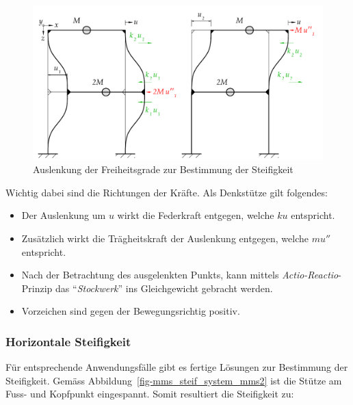 \documentclass[
  letterpaper,
  DIV=11]{scrreprt}
\providecommand{\tightlist}{%
  \setlength{\itemsep}{0pt}\setlength{\parskip}{0pt}}\usepackage{longtable,booktabs,array}
\begin{document}
\begin{figure}[H]

{\centering \includegraphics{index_files/mediabag/bilder/aufgabe_mms_steif_auslenk.pdf}

}

\caption{\label{fig-mms_steif_steifigkeit}Auslenkung der Freiheitsgrade
zur Bestimmung der Steifigkeit}

\end{figure}

Wichtig dabei sind die Richtungen der Kräfte. Als Denkstütze gilt
folgendes:

\begin{itemize}
\tightlist
\item
  Der Auslenkung um \(u\) wirkt die Federkraft entgegen, welche \(k u\)
  entspricht.
\item
  Zusätzlich wirkt die Trägheitskraft der Auslenkung entgegen, welche
  \(m u''\) entspricht.
\item
  Nach der Betrachtung des ausgelenkten Punkts, kann mittels
  \emph{Actio-Reactio}-Prinzip das ``\emph{Stockwerk}'' ins
  Gleichgewicht gebracht werden.
\item
  Vorzeichen sind gegen der Bewegungsrichtig positiv.
\end{itemize}

\hypertarget{horizontale-steifigkeit-2}{%
\subsubsection{Horizontale
Steifigkeit}\label{horizontale-steifigkeit-2}}

Für entsprechende Anwendungsfälle gibt es fertige Lösungen zur
Bestimmung der Steifigkeit. Gemäss
Abbildung~\ref{fig-mms_steif_system_mms2} ist die Stütze am Fuss- und
Kopfpunkt eingespannt. Somit resultiert die Steifigkeit zu:
\end{document}
